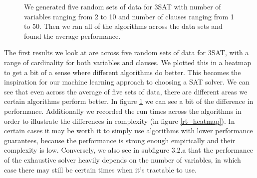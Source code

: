 \documentclass[paper=a4, fontsize=11pt]{scrartcl} %
\numberwithin{equation}{section} %
\numberwithin{figure}{section} %
\numberwithin{table}{section} %
\begin{document}
\begin{figure}[h!]
{{}
}
\vspace{-0.1in}
\caption{We generated five random sets of data for 3SAT with number of variables ranging from 2 to 10 and number of clauses ranging from 1 to 50.  Then we ran all of the algorithms across the data sets and found the average performance.}
\label{nt_heatmap}
\end{figure}

The first results we look at are across five random sets of data for 3SAT, with a range of cardinality for both variables and clauses. We plotted this in a heatmap to get a bit of a sense where different algorithms do better.  This becomes the inspiration for our machine learning approach to choosing a SAT solver.  We can see that even across the average of five sets of data, there are different areas we certain algorithms perform better.  In figure \ref{nt_heatmap} we can see a bit of the difference in performance.  Additionally we recorded the run times across the algorithms in order to illustrate the differences in complexity (in figure \ref{rt_heatmap}).  In certain cases it may be worth it to simply use algorithms with lower performance guarantees, because the performance is strong enough empirically and their complexity is low.  Conversely, we also see in subfigure 3.2.a that the performance of the exhaustive solver heavily depends on the number of variables, in which case there may still be certain times when it's tractable to use.\\
\end{document}
